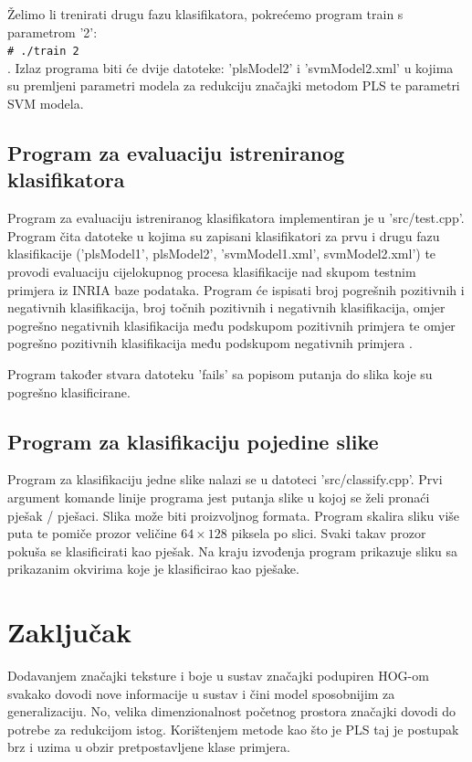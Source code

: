 \documentclass[seminar]{fer}
\newcommand{\shellcmd}[1]{\\\indent\indent\texttt{\footnotesize\# #1}\\}
\begin{document}
Želimo li trenirati drugu fazu klasifikatora, pokrećemo program train s parametrom '2': \shellcmd{./train 2}. Izlaz programa biti će dvije datoteke: 'plsModel2' i 'svmModel2.xml' u kojima su premljeni parametri modela za redukciju značajki metodom PLS te parametri SVM modela. 

\section{Program za evaluaciju istreniranog klasifikatora}

Program za evaluaciju istreniranog klasifikatora implementiran je u 'src/test.cpp'. Program čita datoteke u kojima su zapisani klasifikatori za prvu i drugu fazu klasifikacije ('plsModel1', plsModel2', 'svmModel1.xml', svmModel2.xml') te provodi evaluaciju cijelokupnog procesa klasifikacije nad skupom testnim primjera iz INRIA baze podataka. Program će ispisati broj pogrešnih pozitivnih i negativnih klasifikacija, broj točnih pozitivnih i negativnih klasifikacija, omjer pogrešno negativnih klasifikacija među podskupom pozitivnih primjera  te omjer pogrešno pozitivnih klasifikacija među podskupom negativnih primjera . 

Program također stvara datoteku 'fails' sa popisom putanja do slika koje su pogrešno klasificirane. 

\section{Program za klasifikaciju pojedine slike}

Program za klasifikaciju jedne slike nalazi se u datoteci 'src/classify.cpp'. Prvi argument komande linije programa jest putanja slike u kojoj se želi pronaći pješak / pješaci. Slika može biti proizvoljnog formata. Program skalira sliku više puta te  pomiče prozor veličine $64 \times 128$ piksela po slici. Svaki takav prozor pokuša se klasificirati kao pješak. Na kraju izvođenja program prikazuje sliku sa prikazanim okvirima koje je klasificirao kao pješake.

\chapter{Zaključak}

Dodavanjem značajki teksture i boje u sustav značajki podupiren HOG-om svakako dovodi nove informacije u sustav i čini model sposobnijim za generalizaciju. No, velika dimenzionalnost  početnog prostora značajki dovodi do potrebe za redukcijom istog. Korištenjem metode kao što je PLS taj je postupak brz i uzima u obzir  pretpostavljene klase primjera.
\end{document}
